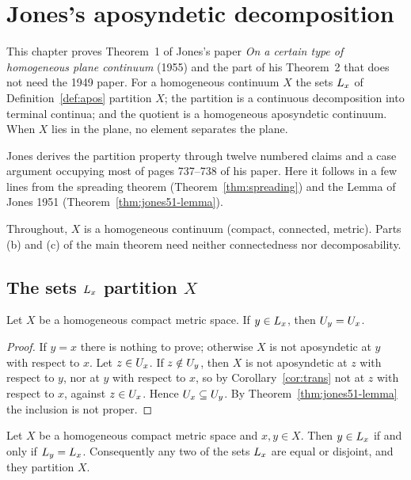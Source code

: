 \chapter{Jones's aposyndetic decomposition}\label{ch:jones55}

This chapter proves Theorem~1 of Jones's paper \emph{On a certain type of homogeneous plane continuum}
(1955) and the part of his Theorem~2 that does not need the 1949 paper. For a homogeneous continuum $X$
the sets $L_{x}$ of Definition~\ref{def:apos} partition $X$; the partition is a continuous decomposition
into terminal continua; and the quotient is a homogeneous aposyndetic continuum. When $X$ lies in the
plane, no element separates the plane.

Jones derives the partition property through twelve numbered claims and a case argument occupying most
of pages 737--738 of his paper. Here it follows in a few lines from the spreading theorem
(Theorem~\ref{thm:spreading}) and the Lemma of Jones 1951 (Theorem~\ref{thm:jones51-lemma}).

Throughout, $X$ is a homogeneous continuum (compact, connected, metric). Parts (b) and (c) of the main
theorem need neither connectedness nor decomposability.

\section{The sets \texorpdfstring{$L_{x}$}{L\_x} partition \texorpdfstring{$X$}{X}}

\begin{lemma}\label{lem:U-eq}
Let $X$ be a homogeneous compact metric space. If $y\in L_{x}$, then $U_{y}=U_{x}$.
\end{lemma}

\begin{proof}
If $y=x$ there is nothing to prove; otherwise $X$ is not aposyndetic at $y$ with respect to $x$. Let $z\in U_{x}$.
If $z\notin U_{y}$, then $X$ is not aposyndetic at $z$ with respect to $y$, nor at $y$ with respect to $x$, so by
Corollary~\ref{cor:trans} not at $z$ with respect to $x$, against $z\in U_{x}$. Hence $U_{x}\subseteq U_{y}$. By
Theorem~\ref{thm:jones51-lemma} the inclusion is not proper.
\end{proof}


\begin{theorem}\label{thm:jones55-b}
Let $X$ be a homogeneous compact metric space and $x,y\in X$. Then $y\in L_{x}$ if and only if $L_{y}=L_{x}$.
Consequently any two of the sets $L_{x}$ are equal or disjoint, and they partition $X$.
\end{theorem}

